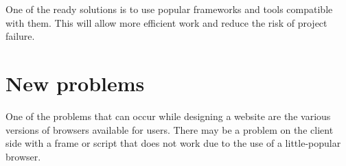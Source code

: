 \documentclass{scrreprt}
\begin{document}
One of the ready solutions is to use popular frameworks and tools compatible with them. This will allow more efficient work and reduce the risk of project failure.

\section{New problems}

One of the problems that can occur while designing a website are the various versions of browsers available for users. There may be a problem on the client side with a frame or script that does not work due to the use of a little-popular browser.


\nocite{*}
\end{document}
